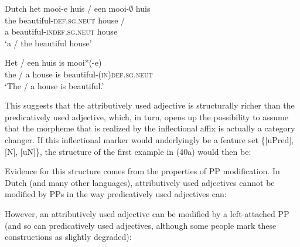 \documentclass[output=paper
,modfonts
,nonflat]{langsci/langscibook}
\begin{document}
\begin{exe}
\ex Dutch
	\xlist
	\ex
	\gll het mooi-e huis \textup{/} een mooi-$\emptyset$ huis \\
	the beautiful-\textsc{def.sg.neut} house  / \\
	a beautiful-\textsc{indef.sg.neut} house \\     
	\glt ‘a / the beautiful house’    
	 
	\ex
	\gll Het \textup{/} een huis is mooi*(-e)\\
	the / a house is beautiful-(\textsc{in})\textsc{def.sg.neut}    \\
	\glt ‘The / a house is beautiful.’ 
	\endxlist
\end{exe}  
This suggests that the attributively used adjective is structurally richer than the predicatively used adjective, which, in turn, opens up the possibility to assume that the morpheme that is realized by the inflectional affix is actually a category changer. If this inflectional marker would underlyingly be a feature set \{[uPred], [N], [uN]\}, the structure of the first example in (40a) would then be:

\begin{figure}[!h]
	\begin{exe}
	\end{exe}
\end{figure}
\noindent Evidence for this structure comes from the properties of PP modification. In Dutch (and many other languages), attributively used adjectives cannot be modified by PPs in the way predicatively used adjectives can:

However, an attributively used adjective can be modified by a left-attached PP (and so can predicatively used adjectives, although some people mark these constructions as slightly degraded):
\end{document}
